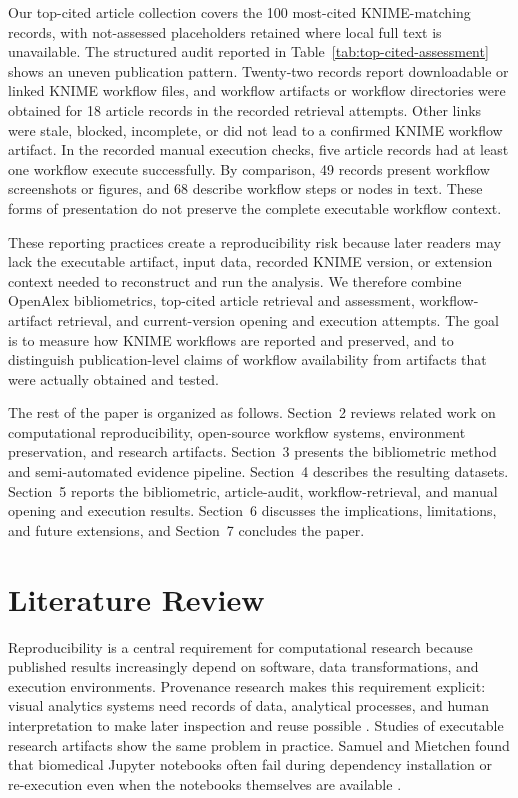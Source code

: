 \documentclass[runningheads]{llncs}
\begin{document}
Our top-cited article collection covers the 100 most-cited KNIME-matching
records, with not-assessed placeholders retained where local full text is
unavailable. The structured audit reported in
Table~\ref{tab:top-cited-assessment} shows an uneven publication pattern.
Twenty-two records report downloadable or linked KNIME workflow files, and
workflow artifacts or workflow directories were obtained for 18 article
records in the recorded retrieval attempts. Other links were stale, blocked,
incomplete, or did not lead to a confirmed KNIME workflow artifact. In the
recorded manual execution checks, five article records had at least one
workflow execute successfully. By comparison, 49 records present workflow
screenshots or figures, and 68 describe workflow steps or nodes in text. These
forms of presentation do not preserve the complete executable workflow
context.

These reporting practices create a reproducibility risk because later readers
may lack the executable artifact, input data, recorded KNIME version, or
extension context needed to reconstruct and run the analysis. We therefore
combine OpenAlex bibliometrics, top-cited article retrieval and assessment,
workflow-artifact retrieval, and current-version opening and execution
attempts. The goal is to measure how KNIME workflows are reported and
preserved, and to distinguish publication-level claims of workflow availability
from artifacts that were actually obtained and tested.

The rest of the paper is organized as follows. Section~2 reviews related work
on computational reproducibility, open-source workflow systems, environment
preservation, and research artifacts. Section~3 presents the bibliometric
method and semi-automated evidence pipeline. Section~4 describes the resulting
datasets. Section~5 reports the bibliometric, article-audit,
workflow-retrieval, and manual opening and execution results. Section~6
discusses the implications, limitations, and future extensions, and Section~7
concludes the paper.

\section{Literature Review}

Reproducibility is a central requirement for computational research because
published results increasingly depend on software, data transformations, and
execution environments. Provenance research makes this requirement explicit:
visual analytics systems need records of data, analytical processes, and human
interpretation to make later inspection and reuse possible
\cite{Walker2013ProveML}. Studies of executable research artifacts show the
same problem in practice. Samuel and Mietchen found that biomedical Jupyter
notebooks often fail during dependency installation or re-execution even when
the notebooks themselves are available
\cite{SamuelMietchen2024JupyterReproducibility}.
\end{document}

